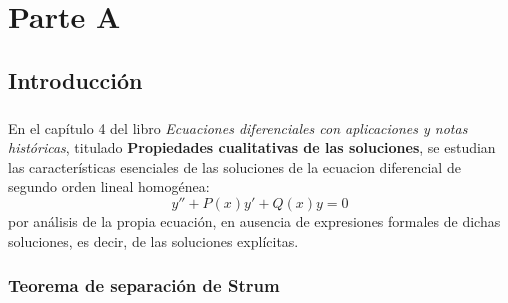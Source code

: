 \chapter{Parte A}
\section{Introducción}
\paragraph{}En el capítulo 4 del libro \textit{Ecuaciones diferenciales con aplicaciones y notas históricas}, titulado \textbf{Propiedades cualitativas de las soluciones}, se estudian las características esenciales de las soluciones de la ecuacion diferencial de segundo orden lineal homogénea: 
$$y''+P(x)y' + Q(x)y = 0$$
por análisis de la propia ecuación, en ausencia de expresiones formales de dichas soluciones, es decir, de las soluciones explícitas.
\subsection{Teorema de separación de Strum}

